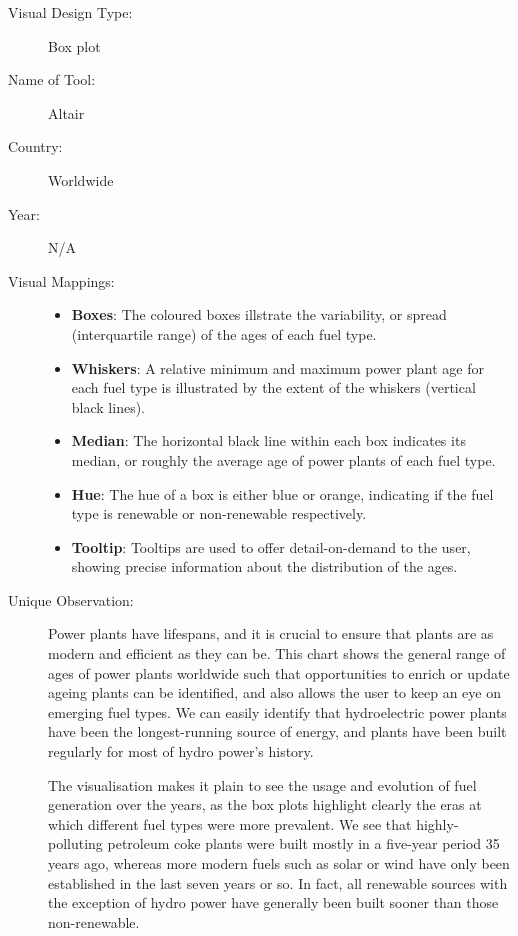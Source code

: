 \begin{description}
\item[Visual Design Type:]
Box plot
\item[Name of Tool:]
Altair
\item[Country:]
Worldwide
\item[Year:]
N/A

\item[Visual Mappings:]
\begin{itemize}
  \item \textbf{Boxes}: The coloured boxes illstrate the variability, or spread (interquartile range) of the ages of each fuel type.
  \item \textbf{Whiskers}: A relative minimum and maximum power plant age for each fuel type is illustrated by the extent of the whiskers (vertical black lines).
  \item \textbf{Median}: The horizontal black line within each box indicates its median, or roughly the average age of power plants of each fuel type.
  \item \textbf{Hue}: The hue of a box is either blue or orange, indicating if the fuel type is renewable or non-renewable respectively.
  \item \textbf{Tooltip}: Tooltips are used to offer detail-on-demand to the user, showing precise information about the distribution of the ages.
\end{itemize}

\item[Unique Observation:]
Power plants have lifespans, and it is crucial to ensure that plants are as modern and efficient as they can be. This chart shows the general range of ages of power plants worldwide such that opportunities to enrich or update ageing plants can be identified, and also allows the user to keep an eye on emerging fuel types. We can easily identify that hydroelectric power plants have been the longest-running source of energy, and plants have been built regularly for most of hydro power's history.

The visualisation makes it plain to see the usage and evolution of fuel generation over the years, as the box plots highlight clearly the eras at which different fuel types were more prevalent. We see that highly-polluting petroleum coke plants were built mostly in a five-year period 35 years ago, whereas more modern fuels such as solar or wind have only been established in the last seven years or so. In fact, all renewable sources with the exception of hydro power have generally been built sooner than those non-renewable.


\end{description}
